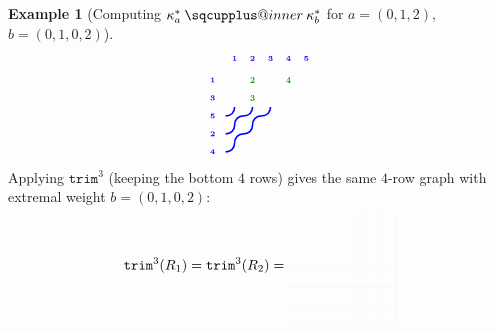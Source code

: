 \documentclass{amsart}
\makeatletter
\newcommand{\sqcupplus@inner}[2]{%
  \vcenter{\hbox{\ooalign{%
    \hfil$\m@th#1\sqcup$\hfil\cr
    \hfil\raisebox{0.15ex}{$\m@th#1\scriptscriptstyle+$}\hfil\cr
  }}}%
}
\newcommand{\sqcupplus}{\mathbin{\mathpalette\sqcupplus@inner\relax}}
\theoremstyle{definition}
\newtheorem{example}[lemma]{Example}
\theoremstyle{remark}
\numberwithin{equation}{subsection}
\newcommand{\trm}{\mathtt{trim}}
\makeatother
\begin{document}
\begin{example}[Computing $\kappa_a^*\sqcupplus\kappa_b^*$ for $a=(0,1,2)$, $b=(0,1,0,2)$]
$$\begin{tikzpicture}[scale=0.45, baseline=(current bounding box.center)]
  \draw[blue, line width=1.125pt] (0.3,2.5) .. controls (0.6,2.5) and (0.8,2.7) .. (0.8,3);
  \draw[blue, line width=1.125pt] (0.8,2) .. controls (0.8,2.3) and (1,2.5) .. (1.3,2.5);
  \draw[blue, line width=1.125pt] (1.3,2.5) .. controls (1.6,2.5) and (1.8,2.7) .. (1.8,3);
  \draw[blue, line width=1.125pt] (1.8,2) .. controls (1.8,2.3) and (2,2.5) .. (2.3,2.5);
  \draw[blue, line width=1.125pt] (2.3,2.5) .. controls (2.6,2.5) and (2.8,2.7) .. (2.8,3);
  \draw[blue, line width=1.125pt] (0.3,1.5) .. controls (0.6,1.5) and (0.8,1.7) .. (0.8,2);
  \draw[blue, line width=1.125pt] (0.8,1) .. controls (0.8,1.3) and (1,1.5) .. (1.3,1.5);
  \draw[blue, line width=1.125pt] (1.3,1.5) .. controls (1.6,1.5) and (1.8,1.7) .. (1.8,2);
  \draw[blue, line width=1.125pt] (0.3,0.5) .. controls (0.6,0.5) and (0.8,0.7) .. (0.8,1);
  \node[font=\tiny\bfseries, text=blue, anchor=south] at (0.8,5.3) {1};
  \node[font=\tiny\bfseries, text=blue, anchor=south] at (1.8,5.3) {2};
  \node[font=\tiny\bfseries, text=blue, anchor=south] at (2.8,5.3) {3};
  \node[font=\tiny\bfseries, text=blue, anchor=south] at (3.8,5.3) {4};
  \node[font=\tiny\bfseries, text=blue, anchor=south] at (4.8,5.3) {5};
  \node[font=\tiny\bfseries, text=blue, anchor=east] at (0,4.5) {1};
  \node[font=\tiny\bfseries, text=blue, anchor=east] at (0,3.5) {3};
  \node[font=\tiny\bfseries, text=blue, anchor=east] at (0,2.5) {5};
  \node[font=\tiny\bfseries, text=blue, anchor=east] at (0,1.5) {2};
  \node[font=\tiny\bfseries, text=blue, anchor=east] at (0,0.5) {4};
  \node[font=\Large\bfseries, text=green!60!black, fill=white, inner sep=0.5pt, circle, transform shape] at (1.8,4.5) {2};
  \node[font=\Large\bfseries, text=green!60!black, fill=white, inner sep=0.5pt, circle, transform shape] at (3.8,4.5) {4};
  \node[font=\Large\bfseries, text=green!60!black, fill=white, inner sep=0.5pt, circle, transform shape] at (1.8,3.5) {3};
\end{tikzpicture}
$$
Applying $\trm^3$ (keeping the bottom $4$ rows) gives the same $4$-row graph with extremal weight $b=(0,1,0,2)$:
$$\trm^3(R_1)=\trm^3(R_2)=
\begin{tikzpicture}[scale=0.45, baseline=(current bounding box.center)]
  \draw[lightgray, very thin, opacity=0.3] (6.3,0) -- (0.3,0);
  \draw[lightgray, very thin, opacity=0.3] (6.3,0) -- (6.3,6);
  \draw[lightgray, very thin, opacity=0.3] (6.3,1) -- (0.3,1);
  \draw[lightgray, very thin, opacity=0.3] (5.3,0) -- (5.3,6);
  \draw[lightgray, very thin, opacity=0.3] (6.3,2) -- (0.3,2);
  \draw[lightgray, very thin, opacity=0.3] (4.3,0) -- (4.3,6);
  \draw[lightgray, very thin, opacity=0.3] (6.3,3) -- (0.3,3);

\end{tikzpicture}$$
\end{example}
\end{document}
